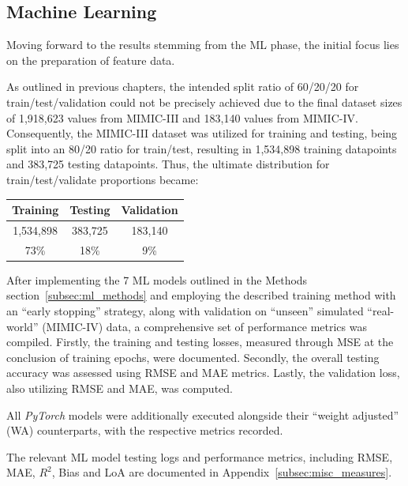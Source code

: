 \newpage

\subsection{Machine Learning}
\label{subsec:machine_learning}

Moving forward to the results stemming from the ML phase, the initial focus lies on the preparation of feature data.

As outlined in previous chapters, the intended split ratio of 60/20/20 for train/test/validation could not be precisely achieved due to the final dataset sizes of 1,918,623 values from MIMIC-III and 183,140 values from MIMIC-IV\@.
Consequently, the MIMIC-III dataset was utilized for training and testing, being split into an 80/20 ratio for train/test, resulting in 1,534,898 training datapoints and 383,725 testing datapoints.
Thus, the ultimate distribution for train/test/validate proportions became:

\begin{center}
    \begin{tabular}{|c|c|c|}
        \hline
        Training  & Testing & Validation \\
        \hline
        1,534,898 & 383,725 & 183,140    \\
        \hline
        73\%      & 18\%    & 9\%        \\
        \hline
    \end{tabular}
\end{center}

After implementing the 7 ML models outlined in the Methods section~\ref{subsec:ml_methods} and employing the described training method with an \enquote{early stopping} strategy,
along with validation on \enquote{unseen} simulated \enquote{real-world} (MIMIC-IV) data, a comprehensive set of performance metrics was compiled.
Firstly, the training and testing losses, measured through MSE at the conclusion of training epochs, were documented.
Secondly, the overall testing accuracy was assessed using RMSE and MAE metrics.
Lastly, the validation loss, also utilizing RMSE and MAE, was computed.

All \textit{PyTorch} models were additionally executed alongside their \enquote{weight adjusted} (WA) counterparts, with the respective metrics recorded.

The relevant ML model testing logs and performance metrics, including RMSE, MAE, \textit{$R^2$}, Bias and LoA are documented in Appendix~\ref{subsec:misc_measures}.

